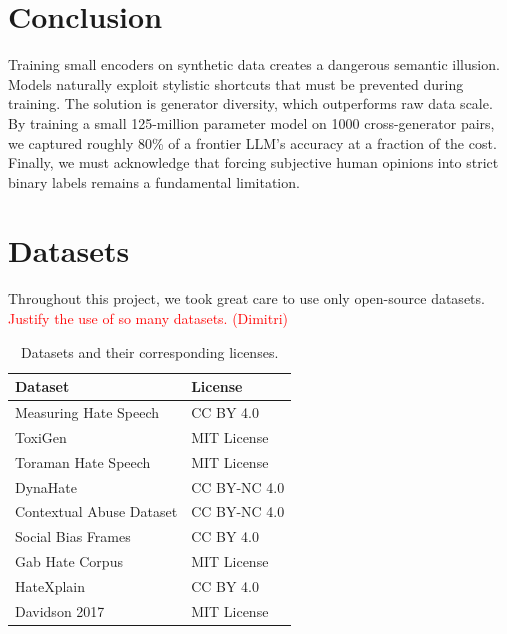 \documentclass[10pt,conference,compsocconf]{IEEEtran}
\begin{document}
\section{Conclusion}
Training small encoders on synthetic data creates a dangerous semantic illusion. Models naturally exploit stylistic shortcuts that must be prevented during training. The solution is generator diversity, which outperforms raw data scale. By training a small 125-million parameter model on 1000 cross-generator pairs, we captured roughly 80\% of a frontier LLM's accuracy at a fraction of the cost. Finally, we must acknowledge that forcing subjective human opinions into strict binary labels remains a fundamental limitation.

\section{Datasets}

Throughout this project, we took great care to use only open-source datasets. \textcolor{red}{Justify the use of so many datasets. (Dimitri)}

\begin{table}[H]
\centering
\begin{tabular}{ll}
\toprule
\textbf{Dataset} & \textbf{License} \\
\midrule
Measuring Hate Speech & CC BY 4.0 \\
ToxiGen & MIT License \\
Toraman Hate Speech & MIT License \\
DynaHate & CC BY-NC 4.0 \\
Contextual Abuse Dataset & CC BY-NC 4.0 \\
Social Bias Frames & CC BY 4.0 \\
Gab Hate Corpus & MIT License \\
HateXplain & CC BY 4.0 \\
Davidson 2017 & MIT License \\
\bottomrule
\end{tabular}
\caption{Datasets and their corresponding licenses.}
\end{table}

\printbibliography
\end{document}
